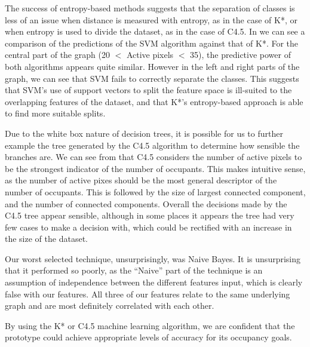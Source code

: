 \documentclass[../thesis/thesis.tex]{subfiles}
\begin{document}
The success of entropy-based methods suggests that the separation of classes is less of an issue when distance is measured with entropy, as in the case of K*, or when entropy is used to divide the dataset, as in the case of C4.5. In  we can see a comparison of the predictions of the SVM algorithm against that of K*. For the central part of the graph (20 $<$ Active pixels $<$ 35), the predictive power of both algorithms appears quite similar. However in the left and right parts of the graph, we can see that SVM fails to correctly separate the classes. This suggests that SVM's use of support vectors to split the feature space is ill-suited to the overlapping features of the dataset, and that K*'s entropy-based approach is able to find more suitable splits.

Due to the white box nature of decision trees, it is possible for us to further example the tree generated by the C4.5 algorithm  to determine how sensible the branches are. We can see from  that C4.5 considers the number of active pixels to be the strongest indicator of the number of occupants. This makes intuitive sense, as the number of active pixes should be the most general descriptor of the number of occupants. This is followed by the size of largest connected component, and the number of connected components. Overall the decisions made by the C4.5 tree appear sensible, although in some places it appears the tree had very few cases to make a decision with, which could be rectified with an increase in the size of the dataset.

Our worst selected technique, unsurprisingly, was Naive Bayes. It is unsurprising that it performed so poorly, as the ``Naive'' part of the technique is an assumption of independence between the different features input, which is clearly false with our features. All three of our features relate to the same underlying graph and are most definitely correlated with each other.

By using the K* or C4.5 machine learning algorithm, we are confident that the prototype could achieve appropriate levels of accuracy for its occupancy goals.
\end{document}
